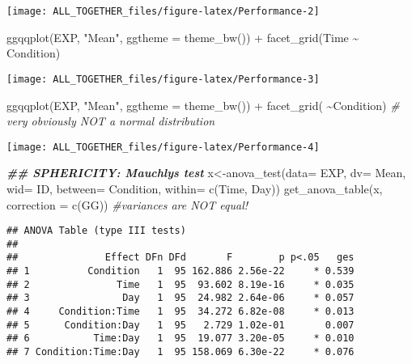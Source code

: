 \documentclass[
]{article}
\newenvironment{Shaded}{\begin{snugshade}}{\end{snugshade}}
\newcommand{\AttributeTok}[1]{\textcolor[rgb]{0.77,0.63,0.00}{#1}}
\newcommand{\CommentTok}[1]{\textcolor[rgb]{0.56,0.35,0.01}{\textit{#1}}}
\newcommand{\DocumentationTok}[1]{\textcolor[rgb]{0.56,0.35,0.01}{\textbf{\textit{#1}}}}
\newcommand{\FunctionTok}[1]{\textcolor[rgb]{0.00,0.00,0.00}{#1}}
\newcommand{\NormalTok}[1]{#1}
\newcommand{\OtherTok}[1]{\textcolor[rgb]{0.56,0.35,0.01}{#1}}
\newcommand{\SpecialCharTok}[1]{\textcolor[rgb]{0.00,0.00,0.00}{#1}}
\newcommand{\StringTok}[1]{\textcolor[rgb]{0.31,0.60,0.02}{#1}}
\begin{document}
\texttt{[image: ALL\_TOGETHER\_files/figure-latex/Performance-2]}

\begin{Shaded}
\begin{Highlighting}[]
\FunctionTok{ggqqplot}\NormalTok{(EXP, }\StringTok{"Mean"}\NormalTok{, }\AttributeTok{ggtheme =} \FunctionTok{theme\_bw}\NormalTok{()) }\SpecialCharTok{+}
  \FunctionTok{facet\_grid}\NormalTok{(Time }\SpecialCharTok{\textasciitilde{}}\NormalTok{ Condition)}
\end{Highlighting}
\end{Shaded}

\texttt{[image: ALL\_TOGETHER\_files/figure-latex/Performance-3]}

\begin{Shaded}
\begin{Highlighting}[]
\FunctionTok{ggqqplot}\NormalTok{(EXP, }\StringTok{"Mean"}\NormalTok{, }\AttributeTok{ggtheme =} \FunctionTok{theme\_bw}\NormalTok{()) }\SpecialCharTok{+}
  \FunctionTok{facet\_grid}\NormalTok{( }\SpecialCharTok{\textasciitilde{}}\NormalTok{Condition) }\CommentTok{\#  very obviously NOT a normal distribution}
\end{Highlighting}
\end{Shaded}

\texttt{[image: ALL\_TOGETHER\_files/figure-latex/Performance-4]}

\begin{Shaded}
\begin{Highlighting}[]
\DocumentationTok{\#\# SPHERICITY: Mauchly\textquotesingle{}s test}
\NormalTok{x}\OtherTok{\textless{}{-}}\FunctionTok{anova\_test}\NormalTok{(}\AttributeTok{data=}\NormalTok{ EXP, }\AttributeTok{dv=}\NormalTok{ Mean, }\AttributeTok{wid=}\NormalTok{ ID, }\AttributeTok{between=}\NormalTok{ Condition, }\AttributeTok{within=} \FunctionTok{c}\NormalTok{(Time, Day))}
\FunctionTok{get\_anova\_table}\NormalTok{(x, }\AttributeTok{correction =} \FunctionTok{c}\NormalTok{(}\StringTok{\textquotesingle{}GG\textquotesingle{}}\NormalTok{)) }\CommentTok{\#variances are NOT equal! }
\end{Highlighting}
\end{Shaded}

\begin{verbatim}
## ANOVA Table (type III tests)
## 
##               Effect DFn DFd       F        p p<.05   ges
## 1          Condition   1  95 162.886 2.56e-22     * 0.539
## 2               Time   1  95  93.602 8.19e-16     * 0.035
## 3                Day   1  95  24.982 2.64e-06     * 0.057
## 4     Condition:Time   1  95  34.272 6.82e-08     * 0.013
## 5      Condition:Day   1  95   2.729 1.02e-01       0.007
## 6           Time:Day   1  95  19.077 3.20e-05     * 0.010
## 7 Condition:Time:Day   1  95 158.069 6.30e-22     * 0.076
\end{verbatim}
\end{document}

